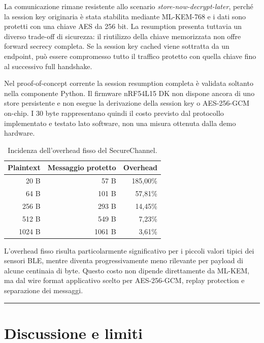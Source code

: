 \documentclass[11pt,a4paper]{article}
\begin{document}
La comunicazione rimane resistente allo scenario
\textit{store-now-decrypt-later}, perché la session key originaria è
stata stabilita mediante ML-KEM-768 e i dati sono protetti con una
chiave AES da 256 bit. La resumption presenta tuttavia un diverso
trade-off di sicurezza: il riutilizzo della chiave memorizzata non offre
forward secrecy completa. Se la session key cached viene sottratta da un
endpoint, può essere compromesso tutto il traffico protetto con quella
chiave fino al successivo full handshake.

Nel proof-of-concept corrente la session resumption completa è validata
soltanto nella componente Python. Il firmware nRF54L15 DK non dispone
ancora di uno store persistente e non esegue la derivazione della
session key o AES-256-GCM on-chip. I 30 byte rappresentano quindi il
costo previsto dal protocollo implementato e testato lato software, non
una misura ottenuta dalla demo hardware.

\begin{table}[H]
    \centering
    \small
    \caption{Incidenza dell'overhead fisso del SecureChannel.}
    \label{tab:secure-channel-overhead}
    \begin{tabular}{r r r}
        \hline
        \textbf{Plaintext} &
        \textbf{Messaggio protetto} &
        \textbf{Overhead} \\
        \hline
        20 B   & 57 B   & 185,00\% \\
        64 B   & 101 B  & 57,81\% \\
        256 B  & 293 B  & 14,45\% \\
        512 B  & 549 B  & 7,23\% \\
        1024 B & 1061 B & 3,61\% \\
        \hline
    \end{tabular}
\end{table}

L'overhead fisso risulta particolarmente significativo per i piccoli
valori tipici dei sensori BLE, mentre diventa progressivamente meno
rilevante per payload di alcune centinaia di byte. Questo costo non
dipende direttamente da ML-KEM, ma dal wire format applicativo scelto
per AES-256-GCM, replay protection e separazione dei messaggi.

\begin{center}\rule{0.5\linewidth}{0.5pt}\end{center}

\section{Discussione e limiti}\label{capitolo-7---discussione-e-limiti}
\end{document}
